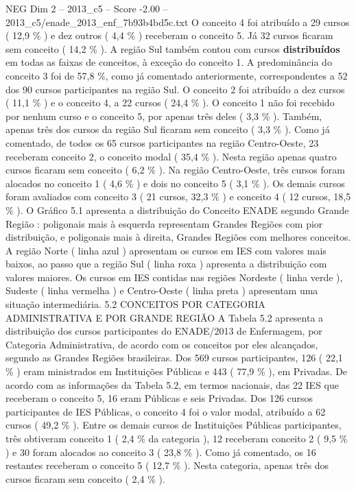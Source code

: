 \begin{textsample}{NEG Dim 2 – 2013\_c5 – Score -2.00 – 2013\_c5/enade\_2013\_enf\_7b93b4bd5c.txt}
O conceito 4 foi atribuído a 29 cursos ( 12,9 \% ) e dez outros ( 4,4 \% ) receberam o conceito 5.
Já 32 cursos ficaram sem conceito ( 14,2 \% ).
A região Sul também contou com cursos \textbf{distribuídos} em todas as faixas de conceitos, à exceção do conceito 1.
A predominância do conceito 3 foi de 57,8 \%, como já comentado anteriormente, correspondentes a 52 dos 90 cursos participantes na região Sul.
O conceito 2 foi atribuído a dez cursos ( 11,1 \% ) e o conceito 4, a 22 cursos ( 24,4 \% ).
O conceito 1 não foi recebido por nenhum curso e o conceito 5, por apenas três deles ( 3,3 \% ).
Também, apenas três dos cursos da região Sul ficaram sem conceito ( 3,3 \% ).
Como já comentado, de todos os 65 cursos participantes na região Centro-Oeste, 23 receberam conceito 2, o conceito modal ( 35,4 \% ).
Nesta região apenas quatro cursos ficaram sem conceito ( 6,2 \% ).
Na região Centro-Oeste, três cursos foram alocados no conceito 1 ( 4,6 \% ) e dois no conceito 5 ( 3,1 \% ).
Os demais cursos foram avaliados com conceito 3 ( 21 cursos, 32,3 \% ) e conceito 4 ( 12 cursos, 18,5 \% ).
O Gráfico 5.1 apresenta a distribuição do Conceito ENADE segundo Grande Região : poligonais mais à esquerda representam Grandes Regiões com pior distribuição, e poligonais mais à direita, Grandes Regiões com melhores conceitos.
A região Norte ( linha azul ) apresentam os cursos em IES com valores mais baixos, ao passo que a região Sul ( linha roxa ) apresenta a distribuição com valores maiores.
Os cursos em IES contidas nas regiões Nordeste ( linha verde ), Sudeste ( linha vermelha ) e Centro-Oeste ( linha preta ) apresentam uma situação intermediária. 5.2 CONCEITOS POR CATEGORIA ADMINISTRATIVA E POR GRANDE REGIÃO A Tabela 5.2 apresenta a distribuição dos cursos participantes do ENADE/2013 de Enfermagem, por Categoria Administrativa, de acordo com os conceitos por eles alcançados, segundo as Grandes Regiões brasileiras.
Dos 569 cursos participantes, 126 ( 22,1 \% ) eram ministrados em Instituições Públicas e 443 ( 77,9 \% ), em Privadas.
De acordo com as informações da Tabela 5.2, em termos nacionais, das 22 IES que receberam o conceito 5, 16 eram Públicas e seis Privadas.
Dos 126 cursos participantes de IES Públicas, o conceito 4 foi o valor modal, atribuído a 62 cursos ( 49,2 \% ).
Entre os demais cursos de Instituições Públicas participantes, três obtiveram conceito 1 ( 2,4 \% da categoria ), 12 receberam conceito 2 ( 9,5 \% ) e 30 foram alocados ao conceito 3 ( 23,8 \% ).
Como já comentado, os 16 restantes receberam o conceito 5 ( 12,7 \% ).
Nesta categoria, apenas três dos cursos ficaram sem conceito ( 2,4 \% ).

\end{textsample}
